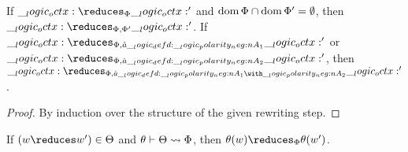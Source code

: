 \begin{lemma}[Weakening]
  If $\octx \reduces_{\orsig} \octx'$ and $\operatorname{dom}{\Phi} \cap \operatorname{dom}{\Phi'} = \emptyset$, then $\octx \reduces_{\orsig, \orsig'} \octx'$.
  If $\octx \reduces_{\orsig, \defp{a} \defd \n{A}_1} \octx'$ or $\octx \reduces_{\orsig, \defp{a} \defd \n{A}_2} \octx'$, then $\octx \reduces_{\orsig, \defp{a} \defd \n{A}_1 \with \n{A}_2} \octx'$.
\end{lemma}
\begin{proof}
  By induction over the structure of the given rewriting step.
\end{proof}

\begin{lemma}
  If $(w \reduces w') \in \srsig$ and $\theta \vdash \Theta \rightsquigarrow \Phi$, then $\theta(w) \reduces_{\orsig} \theta(w')$.
\end{lemma}
